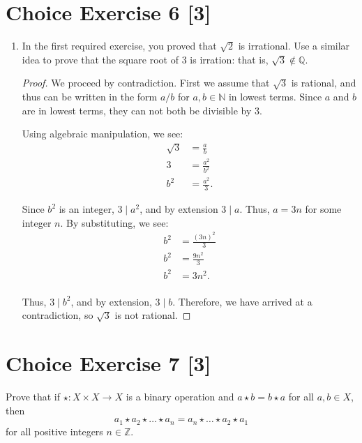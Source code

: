 \documentclass{article}
\begin{document}
\section*{Choice Exercise 6 [3]}
\begin{enumerate}
    \item {
        In the first required exercise, you proved that \(\sqrt{2}\) is irrational.
        Use a similar idea to prove that the square root of 3 is irration: that is, 
        \(\sqrt{3} \not\in \mathbb{Q}\).

        \begin{proof}
            We proceed by contradiction. First we assume that \(\sqrt{3}\) is rational,
            and thus can be written in the form \(a/b\) for \(a, b \in \mathbb{N}\)
            in lowest terms. Since \(a\) and \(b\) are in lowest terms, they can not 
            both be divisible by 3.
            
            Using algebraic manipulation, we see:
            \begin{align*}
                \sqrt{3} &= \frac{a }{b }\\
                3 &= \frac{a^2 }{b^2} \\
                b^2 &= \frac{a^2}{3}.
            \end{align*}

            Since \(b^2\) is an integer, \(3 \mid a^2\), and by extension \(3 \mid a\).
            Thus, \(a = 3n\) for some integer \(n\). By substituting, we see:
            \begin{align*}
                b^2 &= \frac{(3n)^2}{3} \\
                b^2 &= \frac{9n^2}{3} \\
                b^2 &= 3n^2. \\
            \end{align*}

            Thus, \(3 \mid b^2\), and by extension, \(3 \mid b\). Therefore, we have 
            arrived at a contradiction, so \(\sqrt{3}\) is not rational. 
        \end{proof}
    }
\end{enumerate}

\section*{Choice Exercise 7 [3]}
Prove that if \(\star\colon X \times X \to X\) is a binary operation and 
\(a \star b = b \star a\) for all \(a, b \in X\), then
\[a_1 \star a_2 \star \dots \star a_n = a_n \star \dots \star a_2 \star a_1\]
for all positive integers \(n \in \mathbb{Z}\). 
\end{document}
